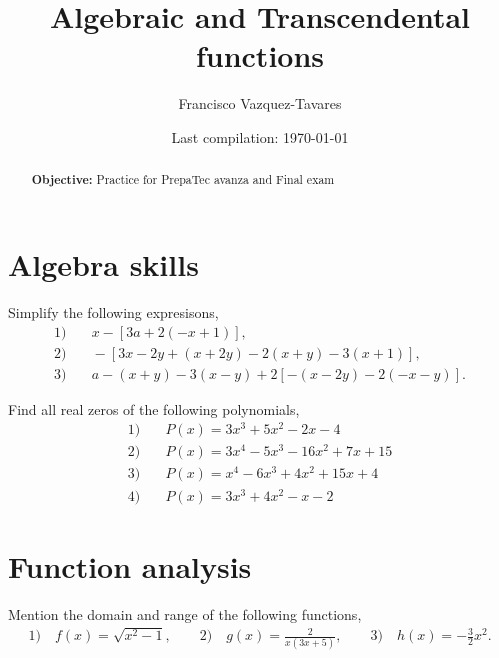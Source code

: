 \documentclass[a4paper]{tufte-handout} %
\title{Algebraic and Transcendental functions}
\author{Francisco Vazquez-Tavares}
\date{Last compilation: \today} %
\begin{document}
\maketitle %


\begin{abstract}
	\textbf{Objective:} Practice for PrepaTec avanza and Final exam
\end{abstract}


\section{Algebra skills}

Simplify the following expresisons,
\begin{align*}
    1) &\quad x-\left[ 3a + 2(-x+1)\right], \\
    2) &\quad -\left[3x-2y+(x+2y)-2(x+y)-3(x+1)\right], \\
    3) &\quad a-(x+y) -3(x-y) +2\left[-(x-2y)-2(-x-y)\right].
\end{align*}

Find all real zeros of the following polynomials,
\begin{align*}
    1) &\quad P(x) = 3x^3 + 5x^2 -2x - 4 \\
    2) &\quad P(x) = 3x^4 -5x^3 -16x^2 +7x + 15 \\
    3) &\quad P(x) = x^4 -6x^3 + 4x^2 +15 x + 4 \\
    4) &\quad P(x) = 3x^3 + 4x^2 -x -2 
\end{align*}

\section{Function analysis}

Mention the domain and range of the following functions,
\begin{align*}
    1) \quad f(x) = \sqrt{x^2 -1}, \qquad 
    2) \quad g(x) = \frac{2}{x(3x+5)}, \qquad
    3) \quad h(x) = -\frac{3}{2}x^2.
\end{align*}
\end{document}
